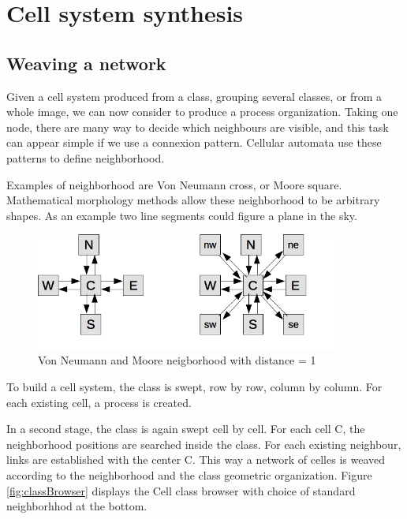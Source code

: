 \section{Cell system synthesis}
\subsection { Weaving a  network }

Given a cell system produced from a class, grouping several classes, or from a whole image, 
we can now consider to produce a process organization. Taking one node, there are many way to decide
which neighbours are visible, and this task can appear simple if we use a connexion pattern.
Cellular automata use these patterns to define neighborhood.

Examples of neighborhood are Von Neumann cross, or Moore square. Mathematical morphology
methods allow these neighborhood to be arbitrary shapes. As an example two line segments
could figure a plane in the sky.


\begin{figure}[hbtp]
\begin{center} 
\includegraphics[width=10cm]   {VonNeumann.png}
\caption{Von Neumann and Moore neigborhood with distance = 1}
\label{fig:VonNeumann}
\end{center}
\end{figure}

To build a cell system, the class is swept, row by row, column by column.
For each existing cell, a process is created.

In a second stage,   the class is again swept cell by cell.
For each cell C,   the neighborhood positions  are searched   inside the class.
For each existing neighbour, links are established with the center C.
This way a network of celles is weaved according to the neighborhood
and the class geometric organization. Figure \ref{fig:classBrowser}
displays the Cell class browser with choice of standard neighborhhod at the bottom.




